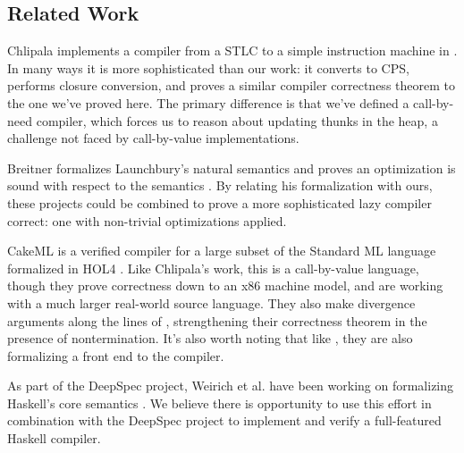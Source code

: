 \subsection{Related Work}

Chlipala implements a compiler from a STLC to a simple instruction machine in
\cite{chlipala2007certified}. In many ways it is more sophisticated than our 
work: it converts to CPS, performs closure conversion, and proves a similar
compiler correctness theorem to the one we've proved here. The primary
difference is that we've defined a call-by-need compiler, which forces us to
reason about updating thunks in the heap, a challenge not faced by
call-by-value implementations.

Breitner formalizes Launchbury's natural semantics and proves an optimization is
sound with respect to the semantics \cite{launchburynatural,breitnerthesis}. By
relating his formalization with ours, these projects could be combined to prove
a more sophisticated lazy compiler correct: one with non-trivial optimizations
applied.

CakeML \cite{cakeml14} is a verified compiler for a large subset of the Standard
ML language formalized in HOL4 \cite{slind2008brief}. Like Chlipala's work, this
is a call-by-value language, though they prove correctness down to an x86
machine model, and are working with a much larger real-world source language.
They also make divergence arguments along the lines of \cite{functionalbigstep},
strengthening their correctness theorem in the presence of nontermination. It's
also worth noting that like \cite{leroy2012compcert}, they are also formalizing
a front end to the compiler. 

As part of the DeepSpec project, Weirich et al. have been working on formalizing
Haskell's core semantics \cite{weirich2017spec, spector2018total}. We believe
there is opportunity to use this effort in combination with the DeepSpec project
to implement and verify a full-featured Haskell compiler.

